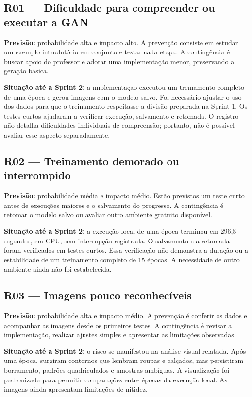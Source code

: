 \documentclass[12pt,a4paper]{article}
\begin{document}
\subsection*{R01 — Dificuldade para compreender ou executar a GAN}
\textbf{Previsão:} probabilidade alta e impacto alto. A prevenção consiste em estudar um exemplo introdutório em conjunto e testar cada etapa. A contingência é buscar apoio do professor e adotar uma implementação menor, preservando a geração básica.

\textbf{Situação até a Sprint 2:} a implementação executou um treinamento completo de uma época e gerou imagens com o modelo salvo. Foi necessário ajustar o uso dos dados para que o treinamento respeitasse a divisão preparada na Sprint 1. Os testes curtos ajudaram a verificar execução, salvamento e retomada. O registro não detalha dificuldades individuais de compreensão; portanto, não é possível avaliar esse aspecto separadamente.

\subsection*{R02 — Treinamento demorado ou interrompido}
\textbf{Previsão:} probabilidade média e impacto médio. Estão previstos um teste curto antes de execuções maiores e o salvamento do progresso. A contingência é retomar o modelo salvo ou avaliar outro ambiente gratuito disponível.

\textbf{Situação até a Sprint 2:} a execução local de uma época terminou em 296,8 segundos, em CPU, sem interrupção registrada. O salvamento e a retomada foram verificados em testes curtos. Essa verificação não demonstra a duração ou a estabilidade de um treinamento completo de 15 épocas. A necessidade de outro ambiente ainda não foi estabelecida.

\subsection*{R03 — Imagens pouco reconhecíveis}
\textbf{Previsão:} probabilidade alta e impacto médio. A prevenção é conferir os dados e acompanhar as imagens desde os primeiros testes. A contingência é revisar a implementação, realizar ajustes simples e apresentar as limitações observadas.

\textbf{Situação até a Sprint 2:} o risco se manifestou na análise visual relatada. Após uma época, surgiram contornos que lembram roupas e calçados, mas persistiram borramento, padrões quadriculados e amostras ambíguas. A visualização foi padronizada para permitir comparações entre épocas da execução local. As imagens ainda apresentam limitações de nitidez.
\end{document}
